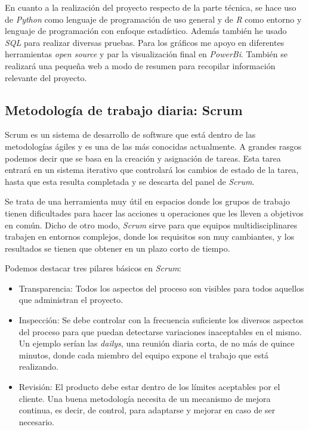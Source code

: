 En cuanto a la realización del proyecto respecto de la parte técnica, se hace uso de \textit{Python} como lenguaje de programación de uso general y de \textit{R} como entorno y lenguaje de programación con enfoque estadístico. Además también he usado \textit{SQL} para realizar diversas pruebas. Para los gráficos me apoyo en diferentes herramientas \textit{open source} y par la visualización final en \textit{PowerBi}. También se realizará una pequeña web a modo de resumen para recopilar información relevante del proyecto. 

\subsection{Metodología de trabajo diaria: Scrum}\label{metodologias_scrum}
Scrum es un sistema de desarrollo de software que está dentro de las metodologías ágiles y es una de las más conocidas actualmente. A grandes rasgos podemos decir que se basa en la creación y asignación de tareas. Esta tarea entrará en un sistema iterativo que controlará los cambios de estado de la tarea, hasta que esta resulta completada y se descarta del panel de \textit{Scrum}. 

Se trata de una herramienta muy útil en espacios donde los grupos de trabajo tienen dificultades para hacer las acciones u operaciones que les lleven a objetivos en común. Dicho de otro modo, \textit{Scrum} sirve para que equipos multidisciplinares trabajen en entornos complejos, donde los requisitos son muy cambiantes, y los resultados se tienen que obtener en un plazo corto de tiempo. 


Podemos destacar tres pilares básicos en \textit{Scrum}:

\begin{itemize}
	\item Transparencia: Todos los aspectos del proceso son visibles para todos aquellos que administran el proyecto.
	\item Inspección: Se debe controlar con la frecuencia suficiente los diversos aspectos del proceso para que puedan detectarse variaciones inaceptables en el mismo. Un ejemplo serían las \textit{dailys}, una reunión diaria corta, de no más de quince minutos, donde cada miembro del equipo expone el trabajo que está realizando.
	\item Revisión: El producto debe estar dentro de los límites aceptables por el cliente. Una buena metodología necesita de un mecanismo de mejora continua, es decir, de control, para adaptarse y mejorar en caso de ser necesario.
	
\end{itemize}

